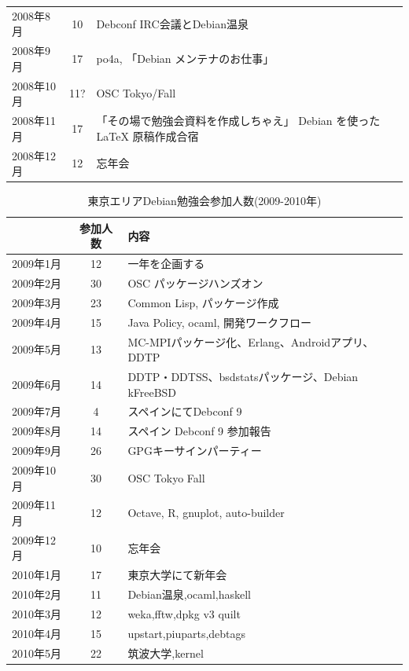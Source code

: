 \documentclass[mingoth,a4paper]{jsarticle}
\begin{document}
\begin{table}[ht]
\begin{minipage}{0.5\hsize}
\begin{center}
\begin{tabular}{|l|c|p{10em}|}
   2008年8月 & 10 & Debconf IRC会議とDebian温泉 \\
   2008年9月 & 17 & po4a, 「Debian メンテナのお仕事」 \\
   2008年10月 & 11? & OSC Tokyo/Fall \\
   2008年11月 & 17 & 「その場で勉強会資料を作成しちゃえ」 Debian を使った \LaTeX{} 原稿作成合宿 \\
   2008年12月 & 12 & 忘年会 \\
 \hline
  \end{tabular}
 \end{center}
\end{minipage}
\end{table}

\begin{table}[t]
\begin{minipage}{0.5\hsize}
 \caption{東京エリアDebian勉強会参加人数(2009-2010年)}\label{tab:count2009}
 \begin{center}
  \begin{tabular}{|l|c|p{10em}|}
 \hline
 & 参加人数 & 内容\\
 \hline
   2009年1月 & 12 & 一年を企画する \\
   2009年2月 & 30 & OSC パッケージハンズオン\\ 
   2009年3月 & 23 & Common Lisp, パッケージ作成 \\
   2009年4月 & 15 & Java Policy, ocaml, 開発ワークフロー\\
   2009年5月 & 13 & MC-MPIパッケージ化、Erlang、Androidアプリ、DDTP \\   
   2009年6月 & 14 & DDTP・DDTSS、bsdstatsパッケージ、Debian kFreeBSD\\
   2009年7月 & 4 & スペインにてDebconf 9\\
   2009年8月 & 14 & スペイン Debconf 9 参加報告 \\   
   2009年9月 & 26 & GPGキーサインパーティー \\   
   2009年10月 & 30 & OSC Tokyo Fall\\
   2009年11月 & 12 & Octave, R, gnuplot, auto-builder \\
   2009年12月 & 10 & 忘年会\\
   2010年1月 & 17 &  東京大学にて新年会 \\
   2010年2月 & 11 & Debian温泉,ocaml,haskell \\
   2010年3月 & 12 & weka,fftw,dpkg v3 quilt \\
   2010年4月 & 15 & upstart,piuparts,debtags \\
   2010年5月 & 22 & 筑波大学,kernel \\

\end{tabular}
\end{center}
\end{minipage}
\end{table}
\end{document}
